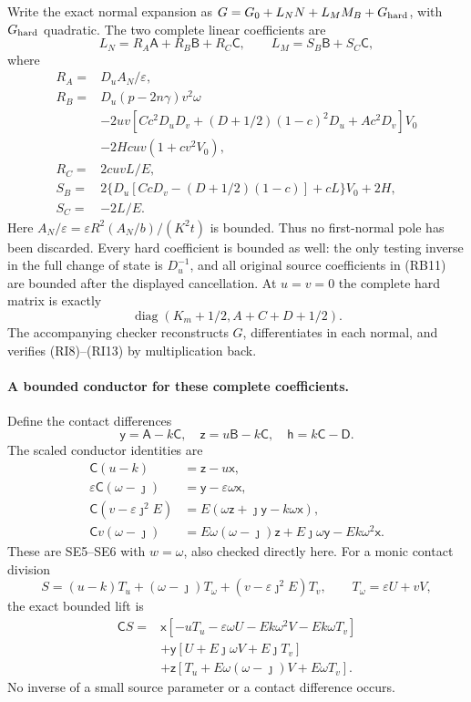 Write the exact normal expansion as
$G=G_0+L_NN+L_MM_B+G_{\rm hard}$, with $G_{\rm hard}$ quadratic.
The two complete linear coefficients are
\[
 L_N=R_A\mathsf A+R_B\mathsf B+R_C\mathsf C,
 \qquad L_M=S_B\mathsf B+S_C\mathsf C,               \tag{RI11}
\]
where
\[
\begin{aligned}
 R_A={}&D_uA_N/\varepsilon,\\
 R_B={}&D_u(p-2n\gamma)v^2\omega\\
 &-2uv[Cc^2D_uD_v+(D+1/2)(1-c)^2D_u+Ac^2D_v]V_0\\
 &-2Hcuv(1+cv^2V_0),\\
 R_C={}&2cuvL/E,\\
 S_B={}&2\{D_u[CcD_v-(D+1/2)(1-c)]+cL\}V_0+2H,\\
 S_C={}&-2L/E.
\end{aligned}                                                      \tag{RI12}
\]
Here $A_N/\varepsilon=
\varepsilon R^2(A_N/b)/(K^2t)$ is bounded. Thus no first-normal
pole has been discarded. Every hard coefficient is bounded as well:
the only testing inverse in the full change of state is $D_u^{-1}$,
and all original source coefficients in (RB11) are bounded after the
displayed cancellation. At $u=v=0$ the complete hard matrix is exactly
\[
 \operatorname{diag}(K_m+1/2,A+C+D+1/2).             \tag{RI13}
\]
The accompanying checker reconstructs $G$, differentiates in each
normal, and verifies (RI8)--(RI13) by multiplication back.

\paragraph{A bounded conductor for these complete coefficients.}
Define the contact differences
\[
 \mathsf y=\mathsf A-k\mathsf C,\quad
 \mathsf z=u\mathsf B-k\mathsf C,\quad
 \mathsf h=k\mathsf C-\mathsf D.
\]
The scaled conductor identities are
\[
\begin{aligned}
 \mathsf C(u-k)&=\mathsf z-u\mathsf x,\\
 \varepsilon\mathsf C(\omega-\jmath)
       &=\mathsf y-\varepsilon\omega\mathsf x,\\
 \mathsf C(v-\varepsilon\jmath^2E)
       &=E(\omega\mathsf z+\jmath\mathsf y-k\omega\mathsf x),\\
 \mathsf Cv(\omega-\jmath)
       &=E\omega(\omega-\jmath)\mathsf z+
         E\jmath\omega\mathsf y-Ek\omega^2\mathsf x.
\end{aligned}                                                       \tag{RI14}
\]
These are SE5--SE6 with $w=\omega$, also checked directly here.
For a monic contact division
\[
 S=(u-k)T_u+(\omega-\jmath)T_\omega+
           (v-\varepsilon\jmath^2E)T_v,
 \qquad T_\omega=\varepsilon U+vV,
\]
the exact bounded lift is
\[
\begin{aligned}
 \mathsf CS={}&\mathsf x[-uT_u-\varepsilon\omega U
                    -Ek\omega^2V-Ek\omega T_v]\\
 &+\mathsf y[U+E\jmath\omega V+E\jmath T_v]\\
 &+\mathsf z[T_u+E\omega(\omega-\jmath)V+E\omega T_v].
\end{aligned}                                                       \tag{RI15}
\]
No inverse of a small source parameter or a contact difference occurs.

